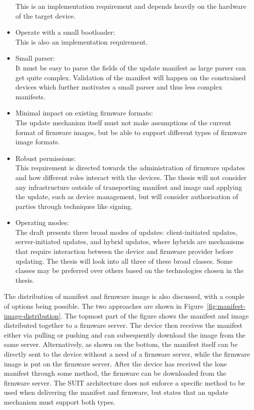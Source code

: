 \documentclass[0-thesis.tex]{subfiles}
\begin{document}
\begin{itemize}
            This is an implementation requirement and depends heavily on the hardware of
            the target device. %
    \item Operate with a small bootloader:\\
            This is also an implementation requirement. %
    \item Small parser:\\
            It must be easy to parse the fields of the update manifest as large parser can
            get quite complex. Validation of the manifest will happen on the constrained
            devices which further motivates a small parser and thus less complex
            manifests.
    \item Minimal impact on existing firmware formats:\\
            The update mechanism itself must not make assumptions of the current format of
            firmware images, but be able to support different types of firmware image
            formats.
    \item Robust permissions:\\
            This requirement is directed towards the administration of firmware updates
            and how different roles interact with the devices. The thesis will not
            consider any infrastructure outside of transporting manifest and image and
            applying the update, such as device management, but will consider
            authorisation of parties through techniques like signing.
    \item Operating modes:\\
            The draft presents three broad modes of updates: client-initiated updates,
            server-initiated updates, and hybrid updates, where hybrids are mechanisms
            that require interaction between the device and firmware provider before
            updating. The thesis will look into all three of these broad classes. Some
            classes may be preferred over others based on the technologies chosen in the
            thesis.
\end{itemize}

The distribution of manifest and firmware image is also discussed, with a couple of
options being possible. The two approaches are shown in
Figure~\ref{fig:manifest-image-distribution}. The topmost part of the figure shows the
manifest and image distributed together to a firmware server. The device then receives the
manifest either via pulling or pushing and can subsequently download the image from the
same server. Alternatively, as shown on the bottom, the manifest itself can be directly
sent to the device without a need of a firmware server, while the firmware image is put on
the firmware server. After the device has received the lone manifest through some method,
the firmware can be downloaded from the firmware server. The SUIT architecture does not
enforce a specific method to be used when delivering the manifest and firmware, but states
that an update mechanism must support both types.
\end{document}
